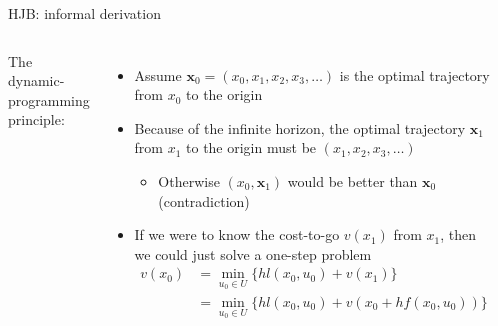 \documentclass[aspectratio=169]{beamer}
\begin{document}
\begin{frame}{HJB: informal derivation}
\begin{columns}
The dynamic-programming principle:
\begin{itemize}
\item
Assume $\mathbf x_0 = (x_0, x_1, x_2, x_3, \ldots)$ is the optimal trajectory from $x_0$ to the origin
\item<2->
Because of the infinite horizon, the optimal trajectory $\mathbf x_1$ from $x_1$ to the origin must be
$(x_1, x_2, x_3, \ldots)$
\begin{itemize}
\item
Otherwise $(x_0, \mathbf x_1)$ would be better than $\mathbf x_0$ (contradiction)
\end{itemize}
\item<3->
If we were to know the cost-to-go $v(x_1)$ from $x_1$, then we could just solve a one-step problem
\begin{align*}
v(x_0) & = \min_{u_0 \in U} \{ h l(x_0, u_0) + v(x_1) \} \\
& = \min_{u_0 \in U} \{ h l(x_0, u_0) + v(x_0 + h f(x_0, u_0)) \} \\
\end{align*}
\end{itemize}
\vspace{-5mm}
\begin{figure}
\includegraphics[width=\columnwidth]{figures/dp_principle.pdf}
\end{figure}
\end{columns}
\end{frame}
\end{document}
